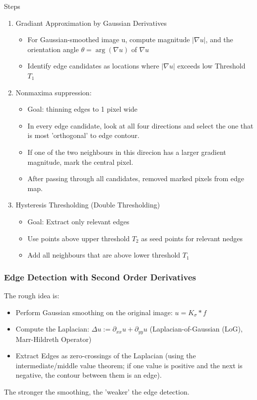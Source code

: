 \documentclass{article}
\begin{document}
Steps
\begin{enumerate}
  \item Gradiant Approximation by Gaussian Derivatives
  \begin{itemize}
    \item For Gaussian-smoothed image u, compute magnitude $|\nabla u|$, and the orientation angle $\theta = \arg(\nabla u)$ of $\nabla u$
    \item Identify edge candidates as locations where $|\nabla u|$ exceeds low Threshold $T_1$
  \end{itemize}
  \item Nonmaxima suppression: 
  \begin{itemize}
    \item Goal: thinning edges to 1 pixel wide 
    \item In every edge candidate, look at all four directions and select the one that is most 'orthogonal' to edge contour.
    \item If one of the two neighbours in this direcion has a larger gradient magnitude, mark the central pixel.
    \item After passing through all candidates, removed marked pixels from edge map.
  \end{itemize}
  \item Hysteresis Thresholding (Double Thresholding)
  \begin{itemize}
    \item Goal: Extract only relevant edges
    \item Use points above upper threshold $T_2$ as seed points for relevant nedges
    \item Add all neighbours that are above lower threshold $T_1$
  \end{itemize}
\end{enumerate}
\subsubsection{Edge Detection with Second Order Derivatives}
The rough idea is:
\begin{itemize}
  \item Perform Gaussian smoothing on the original image: $u = K_\sigma \ast f$
  \item Compute the Laplacian: $\Delta u := \partial_{xx}u + \partial_{yy}u$ (Laplacian-of-Gaussian (LoG), Marr-Hildreth Operator)
  \item Extract Edges as zero-crossings of the Laplacian (using the intermediate/middle value theorem; if one value is positive and the next is negative, the contour between them is an edge).
\end{itemize}
The stronger the smoothing, the 'weaker' the edge detection.
\end{document}
